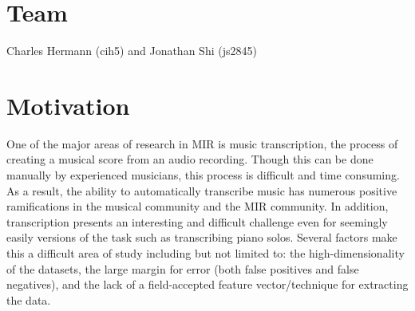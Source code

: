 \documentclass{article}
\begin{document}
 




\section{Team}
Charles Hermann (cih5) and Jonathan Shi (js2845)


\section{Motivation}
One of the major areas of research in MIR is music transcription, the
process of creating a musical score from an audio recording. Though this
can be done manually by experienced musicians, this process is difficult
and time consuming. As a result, the ability to automatically transcribe
music has numerous positive ramifications in the musical community and the
MIR community. In addition, transcription presents an interesting and
difficult challenge even for seemingly easily versions of the task such as
transcribing piano solos. Several factors make this a difficult area of
study including but not limited to: the high-dimensionality of the
datasets, the large margin for error (both false positives and false
negatives), and the lack of a field-accepted feature vector/technique for
extracting the data. 
\end{document}
